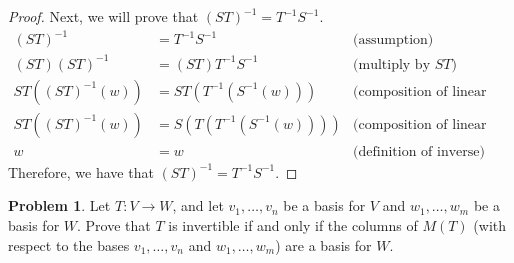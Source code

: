 \documentclass[12pt,reqno]{article}
\theoremstyle{definition}
\newtheorem{problem}{Problem}
\begin{document}
\begin{proof}
    Next, we will prove that $(ST)^{-1} = T^{-1} S^{-1}$.
    \begin{align*}
        (ST)^{-1} &= T^{-1} S^{-1} &\text{(assumption)}\\
        (ST)(ST)^{-1} &= (ST)T^{-1} S^{-1} &\text{(multiply by $ST$)}\\
        ST((ST)^{-1}(w)) &= ST(T^{-1}(S^{-1}(w))) &\text{(composition of linear maps)}\\
        ST((ST)^{-1}(w)) &= S(T(T^{-1}(S^{-1}(w)))) &\text{(composition of linear maps)}\\
        w&=w & \text{(definition of inverse)}
    \end{align*}
    Therefore, we have that $(ST)^{-1} = T^{-1} S^{-1}$.
\end{proof}

\newpage


\begin{problem}
    Let $T: V \rightarrow W$, and let $v_1, \ldots, v_n$ be a basis for $V$ and $w_1,\ldots, w_m$ be a basis for $W$. Prove that $T$ is invertible if and only if the columns of $M(T)$ (with respect to the bases $v_1,\ldots, v_n$ and $w_1,\ldots, w_m$) are a basis for $W$. 
\end{problem}
\end{document}
